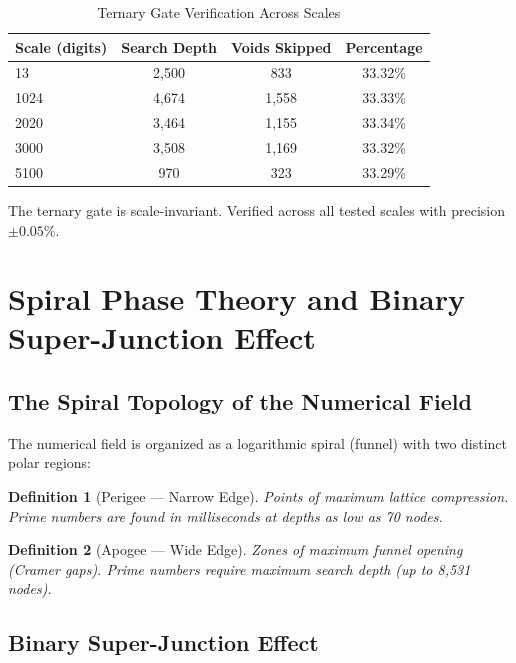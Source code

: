 \documentclass[12pt,a4paper]{article}
\newtheorem{definition}{Definition}[section]
\begin{document}
	\begin{table}[H]
		\centering
		\caption{Ternary Gate Verification Across Scales}
		\label{tab:ternary}
		\begin{tabular}{l c c c}
			\toprule
			\textbf{Scale (digits)} & \textbf{Search Depth} & \textbf{Voids Skipped} & \textbf{Percentage} \\
			\midrule
			13 & 2,500 & 833 & 33.32\% \\
			1024 & 4,674 & 1,558 & 33.33\% \\
			2020 & 3,464 & 1,155 & 33.34\% \\
			3000 & 3,508 & 1,169 & 33.32\% \\
			5100 & 970 & 323 & 33.29\% \\
			\bottomrule
		\end{tabular}
	\end{table}
	
	\begin{verifiedbox}
		The ternary gate is scale-invariant. Verified across all tested scales with precision \(\pm 0.05\%\).
	\end{verifiedbox}
	
	\section{Spiral Phase Theory and Binary Super-Junction Effect}
	
	\subsection{The Spiral Topology of the Numerical Field}
	
	The numerical field is organized as a logarithmic spiral (funnel) with two distinct polar regions:
	
	\begin{definition}[Perigee — Narrow Edge]
		Points of maximum lattice compression. Prime numbers are found in milliseconds at depths as low as 70 nodes.
	\end{definition}
	
	\begin{definition}[Apogee — Wide Edge]
		Zones of maximum funnel opening (Cramer gaps). Prime numbers require maximum search depth (up to 8,531 nodes).
	\end{definition}
	
	\subsection{Binary Super-Junction Effect}
	
\end{document}
